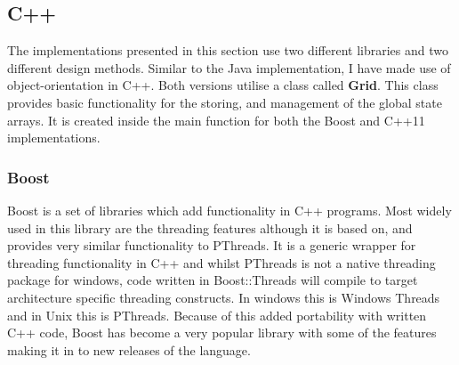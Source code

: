 \documentclass[11pt]{article} %
\begin{document}
\subsection{C++}
The implementations presented in this section use two different libraries and two different design methods. Similar to the Java implementation, I have made use of object-orientation in C++. Both versions utilise a class called {\bf Grid}. This class provides basic functionality for the storing, and management of the global state arrays. It is created inside the main function for both the Boost and C++11 implementations.
\subsubsection{Boost}
Boost is a set of libraries which add functionality in C++ programs. Most widely used in this library are the threading features although it is based on, and provides very similar functionality to PThreads. It is a generic wrapper for threading functionality in C++ and whilst PThreads is not a native threading package for windows, code written in Boost::Threads will compile to target architecture specific threading constructs. In windows this is Windows Threads and in Unix this is PThreads. Because of this added portability with written C++ code, Boost has become a very popular library with some of the features making it in to new releases of the language.
\end{document}
